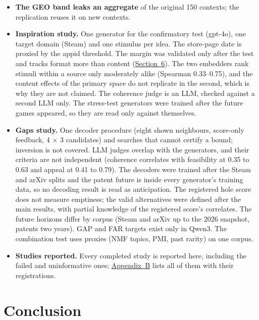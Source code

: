 \documentclass[
  10pt,
]{article}
\begin{document}
\begin{itemize}
  (\hyperref[app:C.1]{Appendix~C.1})
  says for each confirmatory result
  whether the second embedder was run
  and whether the result held there; the
  main failures to replicate are F4, P1,
  P2 with the frozen quantiles and P5.
\item
  \textbf{The GEO band leaks an
  aggregate} of the original 150
  contexts; the replication reuses it on
  new contexts.
\item
  \textbf{Inspiration study.} One
  generator for the confirmatory test
  (gpt-4o), one target domain (Steam)
  and one stimulus per idea. The
  store-page date is proxied by the
  appid threshold. The margin was
  validated only after the test and
  tracks format more than content
  (\hyperref[sec:6]{Section~6}). The two
  embedders rank stimuli within a source
  only moderately alike (Spearman
  0.33--0.75), and the content effects
  of the primary space do not replicate
  in the second, which is why they are
  not claimed. The coherence judge is an
  LLM, checked against a second LLM
  only. The stress-test generators were
  trained after the future games
  appeared, so they are read only
  against themselves.
\item
  \textbf{Gaps study.} One decoder
  procedure (eight shown neighbours,
  score-only feedback, 4 × 3 candidates)
  and searches that cannot certify a
  bound; inversion is not covered. LLM
  judges overlap with the generators,
  and their criteria are not independent
  (coherence correlates with feasibility
  at 0.35 to 0.63 and appeal at 0.41 to
  0.79). The decoders were trained after
  the Steam and arXiv splits and the
  patent future is inside every
  generator's training data, so no
  decoding result is read as
  anticipation. The registered hole
  score does not measure emptiness; the
  valid alternatives were defined after
  the main results, with partial
  knowledge of the registered score's
  correlates. The future horizons differ
  by corpus (Steam and arXiv up to the
  2026 snapshot, patents two years). GAP
  and FAR targets exist only in Qwen3.
  The combination test uses proxies (NMF
  topics, PMI, past rarity) on one
  corpus.
\item
  \textbf{Studies reported.} Every
  completed study is reported here,
  including the failed and uninformative
  ones; \hyperref[app:B]{Appendix~B}
  lists all of them with their
  registrations.
\end{itemize}

\section{Conclusion}\label{sec:9}
\end{document}
